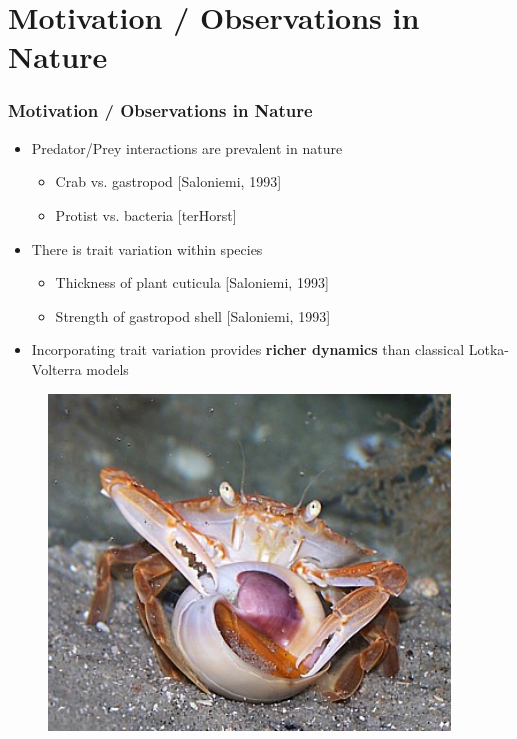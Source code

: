 \documentclass[10pt]{beamer}
\begin{document}
\section{Motivation / Observations in Nature}
\begin{frame}
	\frametitle{Motivation / Observations in Nature}
\begin{minipage}{0.65\textwidth}
	\begin{itemize}
		\item Predator/Prey interactions are prevalent in nature
		\begin{itemize}
			\item Crab vs. gastropod {\tiny[Saloniemi, 1993]}
			\item Protist vs. bacteria {\tiny[terHorst]}
		\end{itemize}
		\item There is trait variation within species
		\begin{itemize}
			\item Thickness of plant cuticula {\tiny[Saloniemi, 1993]}
			\item Strength of gastropod shell {\tiny[Saloniemi, 1993]}
		\end{itemize}
		\item Incorporating trait variation provides {\bf richer dynamics} than classical Lotka-Volterra models
	\end{itemize}
	\end{minipage}
	\begin{minipage}{0.25\textwidth}
	\begin{figure}
	\includegraphics[width=0.95\textwidth]{figures/crab_eating_gastropod.jpg}
	\end{figure}
	\end{minipage}
\end{frame}
\end{document}
